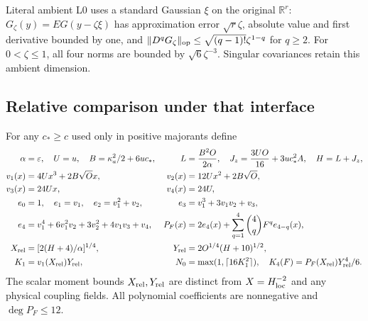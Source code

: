 \documentclass[11pt]{article}
\theoremstyle{plain}
\theoremstyle{definition}
\theoremstyle{remark}
\newcommand{\R}{\mathbb{R}}
\begin{document}
Literal ambient L0 uses a standard Gaussian $\xi$ on the original
$\R^r$: $G_\zeta(y)=E G(y-\zeta\xi)$ has approximation error
$\sqrt r\zeta$, absolute value and first derivative bounded by one,
and $\|D^qG_\zeta\|_{\rm op}\le\sqrt{(q-1)!}\zeta^{1-q}$ for
$q\ge2$. For $0<\zeta\le1$, all four norms are bounded by
$\sqrt6\zeta^{-3}$. Singular covariances retain this ambient dimension.

\subsection{Relative comparison under that interface}
\label{sva:relative}

For any $c_*\ge c$ used only in positive majorants define
\begin{align}\label{sva:constants}
 \alpha&=\varepsilon,\quad U=u,\quad B=\kappa_a^2/2+6uc_*,
 &L&={B^2O\over2\alpha},\quad J_z={3UO\over16}+3uc_*^2A,
 \quad H=L+J_z,\nonumber\\
 v_1(x)&=4Ux^3+2B\sqrt O x,&v_2(x)&=12Ux^2+2B\sqrt O,\nonumber\\
 v_3(x)&=24Ux,&v_4(x)&=24U,\nonumber\\
 e_0&=1,\quad e_1=v_1,\quad e_2=v_1^2+v_2,
 &e_3&=v_1^3+3v_1v_2+v_3,\nonumber\\
 e_4&=v_1^4+6v_1^2v_2+3v_2^2+4v_1v_3+v_4,
 &P_F(x)&=2e_4(x)+\sum_{q=1}^4\binom4q F^qe_{4-q}(x),\nonumber\\
 X_{\rm rel}&=[2(H+4)/\alpha]^{1/4},
 &Y_{\rm rel}&=2O^{1/4}(H+10)^{1/2},\nonumber\\
 K_1&=v_1(X_{\rm rel})Y_{\rm rel},
 &N_0&=\max(1,\lceil16K_1^2\rceil),\quad
 K_4(F)=P_F(X_{\rm rel})Y_{\rm rel}^4/6.
\end{align}
The scalar moment bounds $X_{\rm rel},Y_{\rm rel}$ are distinct from
$X=H^{-2}_{\rm loc}$ and any physical coupling fields. All polynomial
coefficients are nonnegative and $\deg P_F\le12$.
\end{document}
